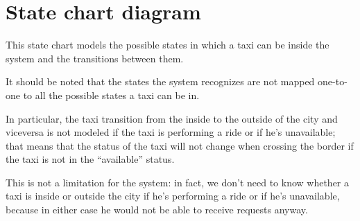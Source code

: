 \begin{landscape}
%
\end{landscape}


\section{State chart diagram}
This state chart models the possible states in which a taxi can be inside the system and the transitions between them.

It should be noted that the states the system recognizes are not mapped one-to-one to all the possible states a taxi can be in. 

In particular, the taxi transition from the inside to the outside of the city and viceversa is not modeled if the taxi is performing a ride or if he's unavailable; that means that the status of the taxi will not change when crossing the border if the taxi is not in the “available” status. 

This is not a limitation for the system: in fact, we don't need to know whether a taxi is inside or outside the city if he's performing a ride or if he's unavailable, because in either case he would not be able to receive requests anyway.

\begin{figure}[H]
\centering
{}
\end{figure}
\pagebreak

